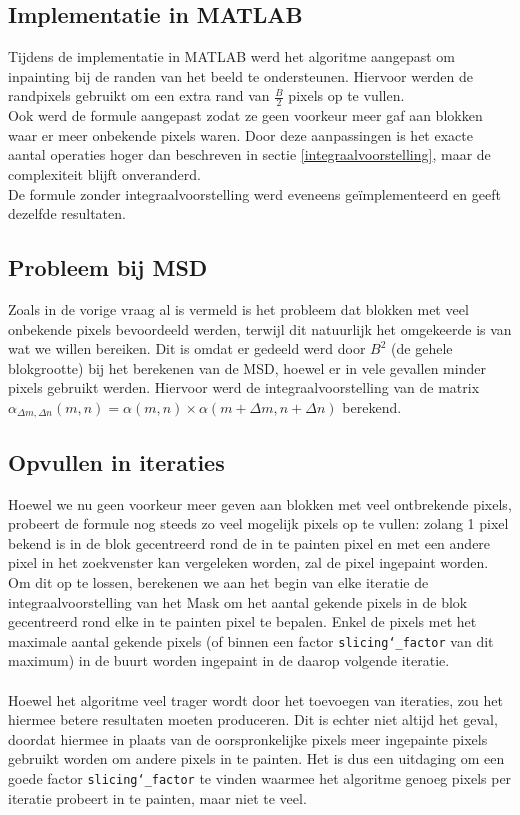\documentclass[titlepage]{article}
\begin{document}
\subsection{Implementatie in MATLAB}
Tijdens de implementatie in MATLAB werd het algoritme aangepast om inpainting bij de randen van het beeld te ondersteunen. Hiervoor werden de randpixels gebruikt om een extra rand van $\frac{B}{2}$ pixels op te vullen. \\
Ook werd de formule aangepast zodat ze geen voorkeur meer gaf aan blokken waar er meer onbekende pixels waren.
Door deze aanpassingen is het exacte aantal operaties hoger dan beschreven in sectie  \ref{integraalvoorstelling}, maar de complexiteit blijft onveranderd. \\
De formule zonder integraalvoorstelling werd eveneens ge\"implementeerd en geeft dezelfde resultaten.

\subsection{Probleem bij MSD}
Zoals in de vorige vraag al is vermeld is het probleem dat blokken met veel onbekende pixels bevoordeeld werden, terwijl dit natuurlijk het omgekeerde is van wat we willen bereiken. Dit is omdat er gedeeld werd door $B^2$ (de gehele blokgrootte) bij het berekenen van de MSD, hoewel er in vele gevallen minder pixels gebruikt werden. Hiervoor werd de integraalvoorstelling van de matrix $\alpha_{\Delta m,\Delta n}(m,n) = \alpha(m,n) \times \alpha(m+\Delta m, n+\Delta n)$ berekend.

\subsection{Opvullen in iteraties} \label{slicing}
Hoewel we nu geen voorkeur meer geven aan blokken met veel ontbrekende pixels, probeert de formule nog steeds zo veel mogelijk pixels op te vullen: zolang 1 pixel bekend is in de blok gecentreerd rond de in te painten pixel en met een andere pixel in het zoekvenster kan vergeleken worden, zal de pixel ingepaint worden.\\
Om dit op te lossen, berekenen we aan het begin van elke iteratie de integraalvoorstelling van het Mask om het aantal gekende pixels in de blok gecentreerd rond elke in te painten pixel te bepalen. Enkel de pixels met het maximale aantal gekende pixels (of binnen een factor \texttt{slicing\char`_factor} van dit maximum) in de buurt worden ingepaint in de daarop volgende iteratie.\\ \\
Hoewel het algoritme veel trager wordt door het toevoegen van iteraties, zou het hiermee betere resultaten moeten produceren. Dit is echter niet altijd het geval, doordat hiermee in plaats van de oorspronkelijke pixels meer ingepainte pixels gebruikt worden om andere pixels in te painten. Het is dus een uitdaging om een goede factor \texttt{slicing\char`_factor} te vinden waarmee het algoritme genoeg pixels per iteratie probeert in te painten, maar niet te veel.
\end{document}
